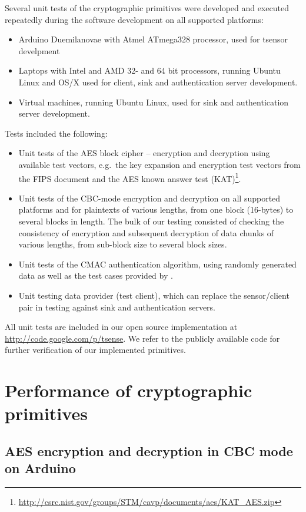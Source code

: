 Several unit tests of the cryptographic primitives were developed and executed repeatedly during the software development on all supported platforms:
\begin{itemize}
\item Arduino Duemilanovae with Atmel ATmega328 processor, used for tsensor develpment
\item Laptops with Intel and AMD 32- and 64 bit processors, running Ubuntu Linux and OS/X used for client, sink and authentication server development.
\item Virtual machines, running Ubuntu Linux, used for sink and authentication server development.
\end{itemize}
%
Tests included the following:
%
\begin{itemize}
\item Unit tests of the AES block cipher -- encryption and decryption using available test vectors, e.g.\ the key expansion and encryption test vectors from the FIPS  document and the AES known answer test (KAT)\footnote{\url{http://csrc.nist.gov/groups/STM/cavp/documents/aes/KAT_AES.zip}}.
\item Unit tests of the CBC-mode encryption and decryption on all supported platforms and for plaintexts of various lengths, from one block (16-bytes) to several blocks in length. The bulk of our testing consisted of checking the consistency of encryption and subsequent decryption of data chunks of various lengths, from sub-block size to several block sizes. 
\item Unit tests of the CMAC authentication algorithm, using randomly generated data as well as the test cases provided by .
\item Unit testing data provider (test client), which can replace the sensor/client pair in testing against sink and authentication servers.
\end{itemize}
All unit tests are included in our open source implementation at \url{http://code.google.com/p/tsense}. We refer to the publicly available code for further verification of our implemented primitives.

\section{Performance of cryptographic primitives}

\subsection{AES encryption and decryption in CBC mode on Arduino}
\label{sec:aes-cbc-performance-arduino}

